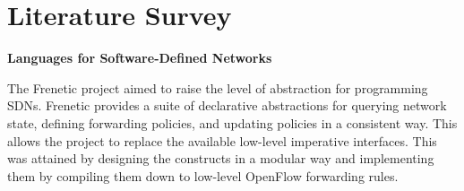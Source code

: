 
\section{Literature Survey}

\textbf{Languages for Software-Defined Networks} 

The Frenetic project aimed to raise the level of abstraction for 
programming SDNs. Frenetic provides a suite of declarative abstractions 
for querying network state, defining forwarding policies, and updating 
policies in a consistent way. This allows the project to replace the 
available low-level imperative interfaces. This was attained by designing 
the constructs in a modular way and implementing them by compiling
them down to low-level OpenFlow forwarding rules. \cite{Foster2013}